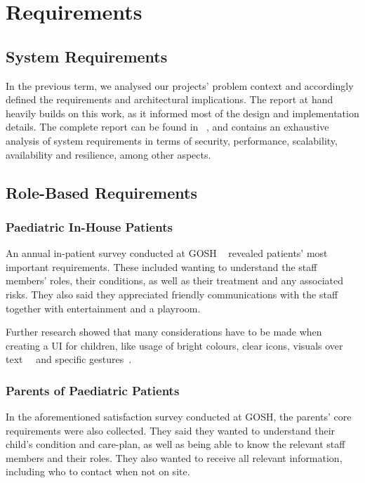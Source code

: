 \documentclass[sigconf]{acmart}
\begin{document}
\section{Requirements}
\label{sec:requirements}

\subsection{System Requirements}

In the previous term, we analysed our projects' problem context and accordingly defined the requirements and architectural implications. The report at hand heavily builds on this work, as it informed most of the design and implementation details. The complete report can be found in ~\cite{speedy-recovery-requirements}, and contains an exhaustive analysis of system requirements in terms of security, performance, scalability, availability and resilience, among other aspects.


\subsection{Role-Based Requirements}
\label{sec:role-requirements}


\subsubsection{Paediatric In-House Patients}

An annual in-patient survey conducted at GOSH ~\cite{gosh-satisfaction-survey} revealed patients' most important requirements. These included wanting to understand the staff members' roles, their conditions, as well as their treatment and any associated risks. They also said they appreciated friendly communications with the staff together with entertainment and a playroom.

Further research showed that many considerations have to be made when creating a UI for children, like usage of bright colours, clear icons, visuals over text~\cite{design-apps-kids-1}~\cite{design-apps-kids-2} and specific gestures~\cite{childrens-interactions}.


\subsubsection{Parents of Paediatric Patients}

In the aforementioned satisfaction survey conducted at GOSH, the parents' core requirements were also collected. They said they wanted to understand their child's condition and care-plan, as well as being able to know the relevant staff members and their roles. They also wanted to receive all relevant information, including who to contact when not on site.
\end{document}
